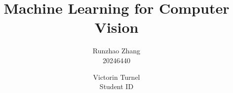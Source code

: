 \documentclass[10pt,twocolumn,letterpaper]{article}
\begin{document}
	
	\title{Machine Learning for Computer Vision}
	
	\author{Runzhao Zhang\\
		20246440\\
	\and
	Victorin Turnel\\
	Student ID\\
}
\maketitle

	\vspace{0.5cm}
	
	\clearpage
	
	\clearpage
	
	\clearpage
	
	\clearpage
	
	
\end{document}
